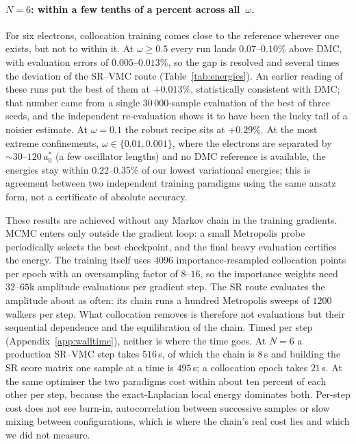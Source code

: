 \paragraph{$N{=}6$: within a few tenths of a percent across all~$\omega$.}
For six electrons, collocation training comes close to the reference wherever one exists,
but not to within it. At $\omega\ge0.5$ every run lands $0.07$--$0.10\%$ above DMC, with
evaluation errors of $0.005$--$0.013\%$, so the gap is resolved and several times the
deviation of the SR--VMC route (Table~\ref{tab:energies}). An earlier reading of these runs put
the best of them at $+0.013\%$, statistically consistent with DMC; that number came from a
single $30\,000$-sample evaluation of the best of three seeds, and the independent
re-evaluation shows it to have been the lucky tail of a noisier estimate. At $\omega=0.1$
the robust recipe sits at $+0.29\%$. At the most extreme confinements,
$\omega\in\{0.01,0.001\}$, where the electrons are separated by
${\sim}30$--$120\,a_0^\ast$ (a few oscillator lengths) and no DMC reference is available,
the energies stay within $0.22$--$0.35\%$ of our lowest variational energies; this is
agreement between two independent training paradigms using the same ansatz form, not a certificate
of absolute accuracy.

These results are achieved without any Markov chain in the training gradients.
MCMC enters only outside the gradient loop: a small Metropolis probe periodically selects the
best checkpoint, and the final heavy evaluation certifies the energy.
The training itself uses $4096$ importance-resampled collocation
points per epoch with an oversampling factor of $8$--$16$, so the importance weights need
$32$--$65$k amplitude evaluations per gradient step. The SR route evaluates the amplitude
about as often: its chain runs a hundred Metropolis sweeps of $1200$ walkers per step. What
collocation removes is therefore not evaluations but their sequential dependence and the
equilibration of the chain. Timed per step (Appendix~\ref{app:walltime}), neither is where the
time goes. At $N{=}6$ a production SR--VMC step takes $516$\,s, of which the chain is $8$\,s
and building the SR score matrix one sample at a time is $495$\,s; a collocation epoch takes
$21$\,s. At the same optimiser the two paradigms cost within about ten percent of each other
per step, because the exact-Laplacian local energy dominates both. Per-step cost does not see
burn-in, autocorrelation between successive samples or slow mixing between configurations,
which is where the chain's real cost lies and which we did not measure.

